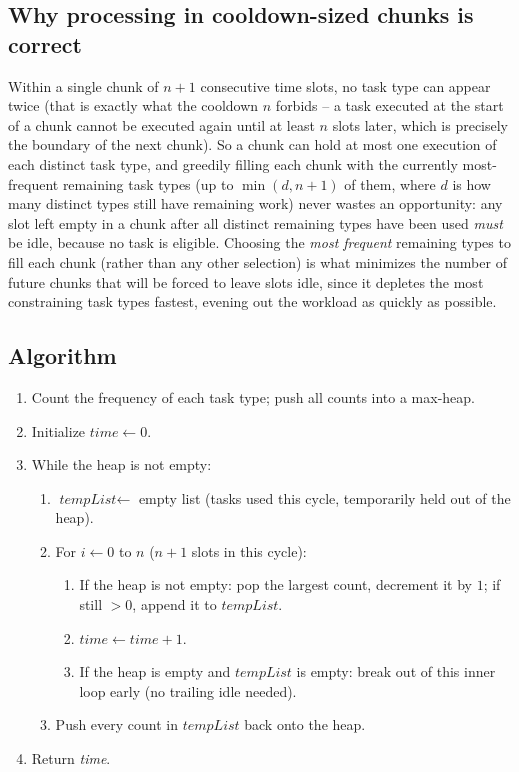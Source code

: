 \subsection*{Why processing in cooldown-sized chunks is correct}

Within a single chunk of $n+1$ consecutive time slots, no task type can
appear twice (that is exactly what the cooldown $n$ forbids -- a task
executed at the start of a chunk cannot be executed again until at least
$n$ slots later, which is precisely the boundary of the next chunk). So a
chunk can hold at most one execution of each distinct task type, and
greedily filling each chunk with the currently most-frequent remaining
task types (up to $\min(d, n+1)$ of them, where $d$ is how many distinct
types still have remaining work) never wastes an opportunity: any
slot left empty in a chunk after all distinct remaining types have been
used \emph{must} be idle, because no task is eligible. Choosing the
\emph{most frequent} remaining types to fill each chunk (rather than any
other selection) is what minimizes the number of future chunks that will
be forced to leave slots idle, since it depletes the most constraining
task types fastest, evening out the workload as quickly as possible.

\subsection*{Algorithm}

\begin{enumerate}
  \item Count the frequency of each task type; push all counts into a
        max-heap.
  \item Initialize $\textit{time} \gets 0$.
  \item While the heap is not empty:
  \begin{enumerate}
    \item $\textit{tempList} \gets$ empty list (tasks used this cycle,
          temporarily held out of the heap).
    \item For $i \gets 0$ to $n$ ($n+1$ slots in this cycle):
    \begin{enumerate}
      \item If the heap is not empty: pop the largest count, decrement
            it by $1$; if still $>0$, append it to $\textit{tempList}$.
      \item $\textit{time} \gets \textit{time}+1$.
      \item If the heap is empty and $\textit{tempList}$ is empty: break
            out of this inner loop early (no trailing idle needed).
    \end{enumerate}
    \item Push every count in $\textit{tempList}$ back onto the heap.
  \end{enumerate}
  \item Return \textit{time}.
\end{enumerate}

